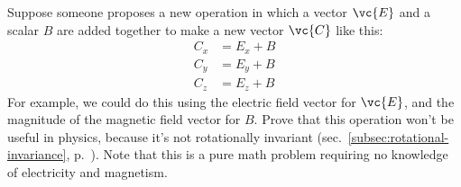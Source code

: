Suppose someone proposes a new operation in which a vector $\vc{E}$ and
a scalar $B$ are added together to make a new vector $\vc{C}$ like this:
\begin{align*}
  C_x &= E_x + B \\
  C_y &= E_y + B \\
  C_z &= E_z + B 
\end{align*}
For example, we could do this using the electric field vector for $\vc{E}$,
and the magnitude of the magnetic field vector for $B$.
Prove that this operation won't be useful in physics, because it's not
rotationally invariant (sec.~\ref{subsec:rotational-invariance}, p.~\pageref{subsec:rotational-invariance}).
Note that this is a pure math problem requiring no knowledge of electricity and magnetism.
